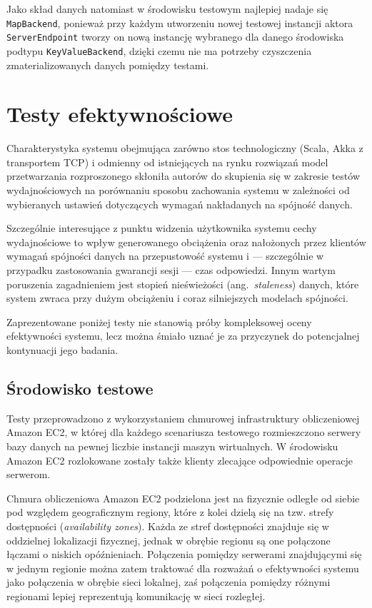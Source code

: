 Jako skład danych natomiast w środowisku testowym najlepiej nadaje się \texttt{MapBackend}, ponieważ przy każdym utworzeniu nowej testowej instancji aktora \texttt{ServerEndpoint} tworzy on nową instancję wybranego dla danego środowiska podtypu \texttt{KeyValueBackend}, dzięki czemu nie ma potrzeby czyszczenia zmaterializowanych danych pomiędzy testami.

\section{Testy efektywnościowe} \label{section:perftests}

Charakterystyka systemu obejmująca zarówno stos technologiczny (Scala, Akka z transportem TCP) i odmienny od istniejących na rynku rozwiązań model przetwarzania rozproszonego skłoniła autorów do skupienia się w zakresie testów wydajnościowych na porównaniu sposobu zachowania systemu w zależności od wybieranych ustawień dotyczących wymagań nakładanych na spójność danych.

Szczególnie interesujące z punktu widzenia użytkownika systemu cechy wydajnościowe to wpływ
generowanego obciążenia oraz nałożonych przez klientów wymagań spójności danych na przepustowość
systemu i --- szczególnie w przypadku zastosowania gwarancji sesji --- czas odpowiedzi. Innym wartym
poruszenia zagadnieniem jest stopień nieświeżości (ang.\ \textit{staleness}) danych, które system zwraca przy dużym obciążeniu i coraz silniejszych modelach spójności.

Zaprezentowane poniżej testy nie stanowią próby kompleksowej oceny efektywności systemu, lecz można śmiało uznać je za przyczynek do potencjalnej kontynuacji jego badania.

\subsection{Środowisko testowe}

Testy przeprowadzono z wykorzystaniem chmurowej infrastruktury obliczeniowej Amazon EC2, w której dla każdego scenariusza testowego rozmieszczono serwery bazy danych na pewnej liczbie instancji maszyn wirtualnych. W środowisku Amazon EC2 rozlokowane zostały także klienty zlecające odpowiednie operacje serwerom.

Chmura obliczeniowa Amazon EC2 podzielona jest na fizycznie odległe od siebie pod względem geograficznym regiony, które z kolei dzielą się na tzw. strefy dostępności (\textit{availability zones}). Każda ze stref dostępności znajduje się w oddzielnej lokalizacji fizycznej, jednak w obrębie regionu są one połączone łączami o niskich opóźnieniach. Połączenia pomiędzy serwerami znajdującymi się w jednym regionie można zatem traktować dla rozważań o efektywności systemu jako połączenia w obrębie sieci lokalnej, zaś połączenia pomiędzy różnymi regionami lepiej reprezentują komunikację w sieci rozległej.


